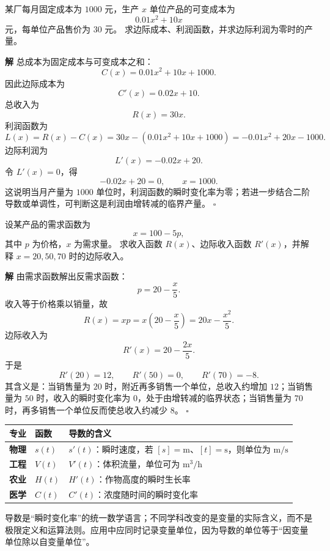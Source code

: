 \documentclass[fontset=fandol]{ctexart}
\newenvironment{solution}{\par\noindent\textbf{解}\quad}{\hfill$\square$\par\vspace{0.8em}}
\begin{document}
\begin{example}
某厂每月固定成本为 $1000$ 元，生产 $x$ 单位产品的可变成本为
\[
0.01x^2+10x
\]
元，每单位产品售价为 $30$ 元。 求边际成本、利润函数，并求边际利润为零时的产量。
\end{example}
\begin{solution}
总成本为固定成本与可变成本之和：
\[
C(x)=0.01x^2+10x+1000.
\]
因此边际成本为
\[
C'(x)=0.02x+10.
\]
总收入为
\[
R(x)=30x.
\]
利润函数为
\[
L(x)=R(x)-C(x)=30x-(0.01x^2+10x+1000)
=-0.01x^2+20x-1000.
\]
边际利润为
\[
L'(x)=-0.02x+20.
\]
令 $L'(x)=0$，得
\[
-0.02x+20=0,\qquad x=1000.
\]
这说明当月产量为 $1000$ 单位时，利润函数的瞬时变化率为零；若进一步结合二阶导数或单调性，可判断这是利润由增转减的临界产量。
\end{solution}

\begin{example}[需求函数与边际收入]
设某产品的需求函数为
\[
x=100-5p,
\]
其中 $p$ 为价格，$x$ 为需求量。 求收入函数 $R(x)$、边际收入函数 $R'(x)$，并解释 $x=20,50,70$ 时的边际收入。
\end{example}
\begin{solution}
由需求函数解出反需求函数：
\[
p=20-\frac{x}{5}.
\]
收入等于价格乘以销量，故
\[
R(x)=xp=x\left(20-\frac{x}{5}\right)=20x-\frac{x^2}{5}.
\]
边际收入为
\[
R'(x)=20-\frac{2x}{5}.
\]
于是
\[
R'(20)=12,\qquad R'(50)=0,\qquad R'(70)=-8.
\]
其含义是：当销售量为 $20$ 时，附近再多销售一个单位，总收入约增加 $12$；当销售量为 $50$ 时，收入的瞬时变化率为 $0$，处于由增转减的临界状态；当销售量为 $70$ 时，再多销售一个单位反而使总收入约减少 $8$。
\end{solution}

\begin{center}
\small
\begin{tabularx}{\textwidth}{>{\bfseries}p{1.4cm} p{2.0cm} X}
\toprule
专业 & 函数 & 导数的含义 \\
\midrule
物理 & $s(t)$ & $s'(t)$：瞬时速度，若 $[s]=\mathrm m$、$[t]=\mathrm s$，则单位为 $\mathrm{m/s}$ \\
工程 & $V(t)$ & $V'(t)$：体积流量，单位可为 $\mathrm{m^3/h}$ \\
农业 & $H(t)$ & $H'(t)$：作物高度的瞬时生长率 \\
医学 & $C(t)$ & $C'(t)$：浓度随时间的瞬时变化率 \\
\bottomrule
\end{tabularx}
\end{center}

导数是“瞬时变化率”的统一数学语言；不同学科改变的是变量的实际含义，而不是极限定义和运算法则。应用中应同时记录变量单位，因为导数的单位等于“因变量单位除以自变量单位”。
\end{document}
